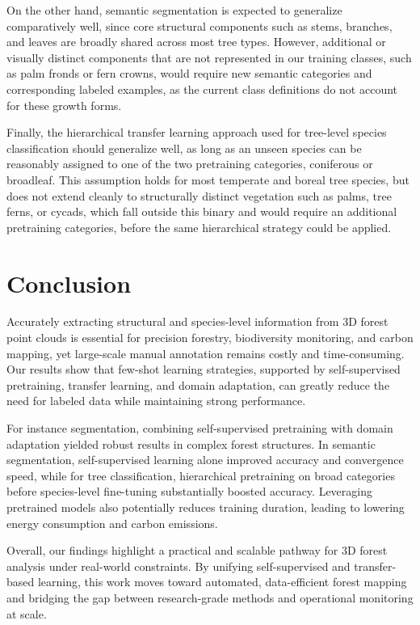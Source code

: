 \documentclass[review,authoryear]{elsarticle}
\begin{document}
On the other hand, semantic segmentation is expected to generalize comparatively well, since core structural components such as stems, branches, and leaves are broadly shared across most tree types. However, additional or visually distinct components that are not represented in our training classes, such as palm fronds or fern crowns, would require new semantic categories and corresponding labeled examples, as the current class definitions do not account for these growth forms. 

Finally, the hierarchical transfer learning approach used for tree-level species classification should generalize well, as long as an unseen species can be reasonably assigned to one of the two pretraining categories, coniferous or broadleaf. This assumption holds for most temperate and boreal tree species, but does not extend cleanly to structurally distinct vegetation such as palms, tree ferns, or cycads, which fall outside this binary and would require an additional pretraining categories, before the same hierarchical strategy could be applied.


\section{Conclusion}
\label{sec:conclusion}

Accurately extracting structural and species-level information from 3D forest point clouds is essential for precision forestry, biodiversity monitoring, and carbon mapping, yet large-scale manual annotation remains costly and time-consuming. Our results show that few-shot learning strategies, supported by self-supervised pretraining, transfer learning, and domain adaptation, can greatly reduce the need for labeled data while maintaining strong performance.

For instance segmentation, combining self-supervised pretraining with domain adaptation yielded robust results in complex forest structures. In semantic segmentation, self-supervised learning alone improved accuracy and convergence speed, while for tree classification, hierarchical pretraining on broad categories before species-level fine-tuning substantially boosted accuracy. Leveraging pretrained models also potentially reduces training duration, leading to lowering energy consumption and carbon emissions.

Overall, our findings highlight a practical and scalable pathway for 3D forest analysis under real-world constraints. By unifying self-supervised and transfer-based learning, this work moves toward automated, data-efficient forest mapping and bridging the gap between research-grade methods and operational monitoring at scale.
\end{document}

